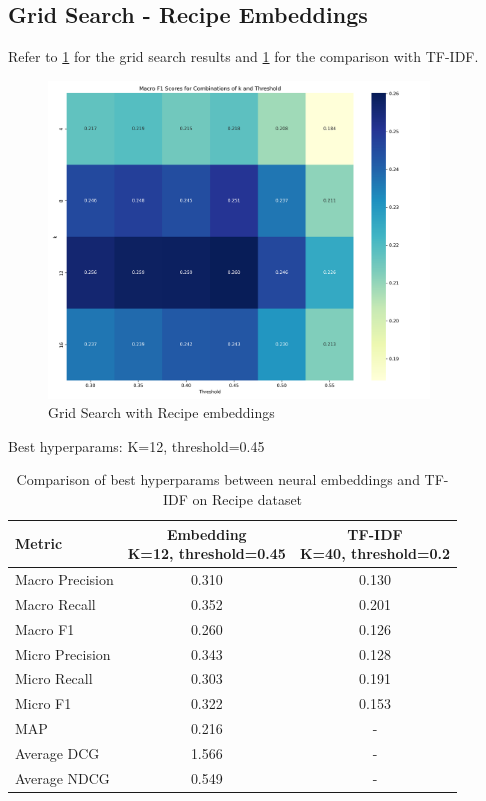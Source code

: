 \documentclass[a4paper,11pt]{article}
\begin{document}
\subsection{Grid Search - Recipe Embeddings}
Refer to \ref{fig:recipe_embeddings_heatmap} for the grid search results and \ref{tab:recipe_embeddings} for the comparison with TF-IDF.
\begin{figure}
    \centering
    \includegraphics[width=0.9\textwidth]{recipies_embeddings_heatmap.png_1747347706.png}
    \caption{Grid Search with Recipe embeddings}
    \label{fig:recipe_embeddings_heatmap}
\end{figure}

Best hyperparams: K=12, threshold=0.45
\begin{table}
    \centering
    \begin{tabular}{|l|c|c|}
        \hline
        Metric          & \makecell{Embedding         \\K=12, threshold=0.45} & \makecell{TF-IDF \\K=40, threshold=0.2}  \\
        \hline
        Macro Precision & 0.310               & 0.130 \\
        Macro Recall    & 0.352               & 0.201 \\
        Macro F1        & 0.260               & 0.126 \\
        Micro Precision & 0.343               & 0.128 \\
        Micro Recall    & 0.303               & 0.191 \\
        Micro F1        & 0.322               & 0.153 \\
        MAP             & 0.216               & -     \\
        Average DCG     & 1.566               & -     \\
        Average NDCG    & 0.549               & -     \\
        \hline
    \end{tabular}
    \caption{Comparison of best hyperparams between neural embeddings and TF-IDF on Recipe dataset}
    \label{tab:recipe_embeddings}
\end{table}
\end{document}
